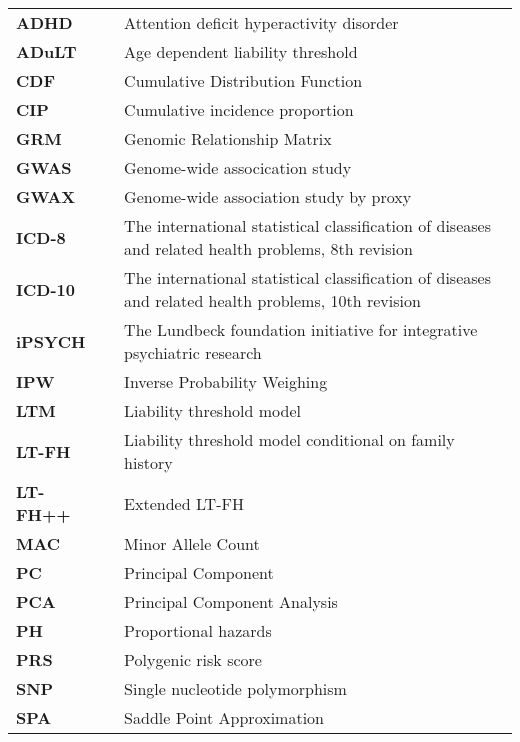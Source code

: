 \begin{table}[h]
	\begin{tabularx}{\textwidth}{l p{0.7cm} p{10cm}}
		\textbf{ADHD}	& 	&	Attention deficit hyperactivity disorder				\\
		\textbf{ADuLT}	&	&	Age dependent liability threshold						\\
		\textbf{CDF}	&	&	Cumulative Distribution Function						\\
		\textbf{CIP} 	&	&	Cumulative incidence proportion  						\\
		\textbf{GRM}	&	&	Genomic Relationship Matrix								\\
		\textbf{GWAS}	&	&	Genome-wide assocication study 							\\
		\textbf{GWAX}	&	&	Genome-wide association study by proxy      			\\
		\textbf{ICD-8} 	&	&	The international statistical classification of diseases and related health problems, 8th revision\\
		\textbf{ICD-10} &	&	The international statistical classification of diseases and related health problems, 10th revision \\
		\textbf{iPSYCH} &	&	The Lundbeck foundation initiative for integrative psychiatric research \\
		\textbf{IPW}	&	&	Inverse Probability Weighing							\\
		\textbf{LTM}	&	&	Liability threshold model								\\
		\textbf{LT-FH}	&	&	Liability threshold model conditional on family history	\\
		\textbf{LT-FH++}&	&	Extended LT-FH                                          \\
		\textbf{MAC}	&	&	Minor Allele Count										\\
		\textbf{PC}		&	&	Principal Component										\\
		\textbf{PCA}	&	&	Principal Component Analysis							\\
		\textbf{PH}		&	& 	Proportional hazards                                    \\
		\textbf{PRS}	&	&	Polygenic risk score									\\
		\textbf{SNP}	&	&	Single nucleotide polymorphism 							\\
		\textbf{SPA}	&	& 	Saddle Point Approximation
	\end{tabularx}
\end{table}